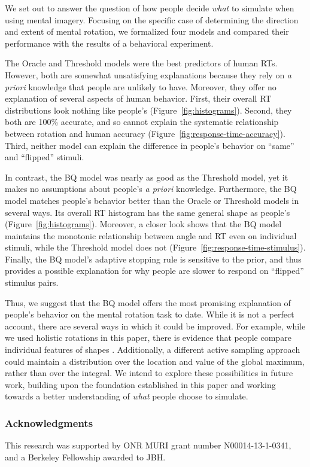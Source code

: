 \documentclass[10pt,letterpaper]{article}
\newcommand{\Oc}[0]{Oracle}
\newcommand{\Th}[0]{Threshold}
\newcommand{\Bq}[0]{BQ}
\begin{document}
We set out to answer the question of how people decide \textit{what}
to simulate when using mental imagery. Focusing on the specific case
of determining the direction and extent of mental rotation, we
formalized four models and compared their performance with the results
of a behavioral experiment.

The \Oc{} and \Th{} models were the best predictors of human
RTs. However, both are somewhat unsatisfying explanations because they
rely on \textit{a priori} knowledge that people are unlikely to
have. Moreover, they offer no explanation of several aspects of human
behavior. First, their overall RT distributions look nothing like
people's (Figure~\ref{fig:histograms}).  Second, they both are 100\%
accurate, and so cannot explain the systematic relationship between
rotation and human accuracy
(Figure~\ref{fig:response-time-accuracy}). Third, neither model can
explain the difference in people's behavior on ``same'' and
``flipped'' stimuli.

In contrast, the \Bq{} model was nearly as good as the \Th{} model,
yet it makes no assumptions about people's \textit{a priori}
knowledge. Furthermore, the \Bq{} model matches people's behavior
better than the \Oc{} or \Th{} models in several ways. Its overall RT
histogram has the same general shape as people's
(Figure~\ref{fig:histograms}).  Moreover, a closer look shows that the
\Bq{} model maintains the monotonic relationship between angle and RT
even on individual stimuli, while the \Th{} model does not
(Figure~\ref{fig:response-time-stimulus}). Finally, the \Bq{} model's
adaptive stopping rule is sensitive to the prior, and thus provides a
possible explanation for why people are slower to respond on
``flipped'' stimulus pairs.

Thus, we suggest that the \Bq{} model offers the most promising
explanation of people's behavior on the mental rotation task to
date. While it is not a perfect account, there are several ways in
which it could be improved. For example, while we used holistic
rotations in this paper, there is evidence that people compare
individual features of shapes
\cite{Just1976,Yuille:1982tx}. Additionally, a different active
sampling approach could maintain a distribution over the location and
value of the global maximum, rather than over the integral. We intend
to explore these possibilities in future work, building upon the
foundation established in this paper and working towards a better
understanding of \textit{what} people choose to simulate.



\subsubsection{Acknowledgments} {\small This research was supported by ONR
  MURI grant number N00014-13-1-0341, and a Berkeley Fellowship
  awarded to JBH. }


\renewcommand{\bibliographytypesize}{\small}
\setlength{\bibleftmargin}{.125in}
\setlength{\bibindent}{-\bibleftmargin}

\end{document}
